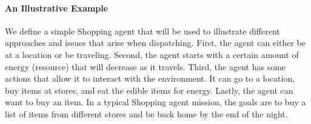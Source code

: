 
\paragraph{An Illustrative Example} We define a simple Shopping agent
that will be used to illustrate different approaches and issues that
arise when dispatching. First, the agent can either be at a location or be
traveling. Second, the agent starts with a certain amount of
energy (resource) that will decrease as it travels. Third, the agent has some
actions that allow it to interact with the environment. It can go to a location,
buy items at stores, and eat the edible items for energy. Lastly, the agent can
want to buy an item. In a typical Shopping agent mission,
the goals are to buy a list of items from different stores and be back
home by the end of the night. 

